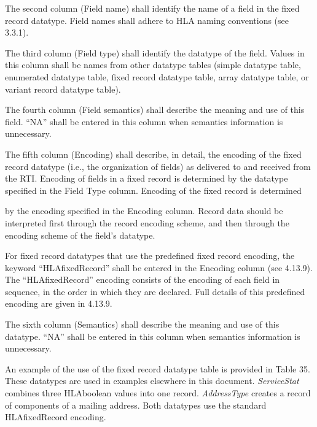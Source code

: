 The second column (Field name) shall identify the name of a field in the fixed record datatype. Field names shall adhere to HLA naming conventions (see 3.3.1).

The third column (Field type) shall identify the datatype of the field. Values in this column shall be names from other datatype tables (simple datatype table, enumerated datatype table, fixed record datatype table, array datatype table, or variant record datatype table).

The fourth column (Field semantics) shall describe the meaning and use of this field. ``NA'' shall be entered in this column when semantics information is unnecessary.

The fifth column (Encoding) shall describe, in detail, the encoding of the fixed record datatype (i.e., the organization of fields) as delivered to and received from the RTI. Encoding of fields in a fixed record is determined by the datatype specified in the Field Type column. Encoding of the fixed record is determined

\newpage
\noindent by the encoding specified in the Encoding column. Record data should be interpreted first through the record encoding scheme, and then through the encoding scheme of the field's datatype.

For fixed record datatypes that use the predefined fixed record encoding, the keyword ``HLAfixedRecord'' shall be entered in the Encoding column (see 4.13.9). The ``HLAfixedRecord'' encoding consists of the encoding of each field in sequence, in the order in which they are declared. Full details of this predefined encoding are given in 4.13.9.

The sixth column (Semantics) shall describe the meaning and use of this datatype. ``NA'' shall be entered in this column when semantics information is unnecessary.

An example of the use of the fixed record datatype table is provided in Table 35. These datatypes are used in examples elsewhere in this document. \textit{ServiceStat} combines three HLAboolean values into one record. \textit{AddressType} creates a record of components of a mailing address. Both datatypes use the standard HLAfixedRecord encoding.

